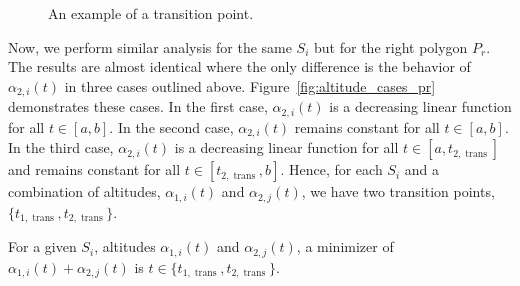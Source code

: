 \documentclass[../main.tex]{subfiles}
\begin{document}

\begin{figure}
	\centering
	
	\caption{An example of a transition point.}
	\label{fig:transition_point}
\end{figure}


Now, we perform similar analysis for the same $S_i$ but for the right polygon $P_r$. The results are almost identical where the only difference is the behavior of $\alpha_{2,i}(t)$ in three cases outlined above. Figure~\ref{fig:altitude_cases_pr} demonstrates these cases. In the first case, $\alpha_{2,i}(t)$ is a decreasing linear function for all $t\in[a,b]$. In the second case, $\alpha_{2,i}(t)$ remains constant for all $t\in[a,b]$. In the third case, $\alpha_{2,i}(t)$ is a decreasing linear function for all $t\in[a,t_{2,\operatorname{trans}}]$ and remains constant for all $t\in[t_{2,\operatorname{trans}},b]$. Hence, for each $S_i$ and a combination of altitudes, $\alpha_{1,i}(t)$ and $\alpha_{2,j}(t)$, we have two transition points, $\{t_{1,\operatorname{trans}}, t_{2,\operatorname{trans}}\}$.
\begin{lemma}
\label{lemma:min_at_trans_pts}
For a given $S_i$, altitudes $\alpha_{1,i}(t)$ and $\alpha_{2,j}(t)$, a minimizer of $\alpha_{1,i}(t)+\alpha_{2,j}(t)$ is $t\in\{t_{1,\operatorname{trans}}, t_{2,\operatorname{trans}}\}$.
\end{lemma}
\end{document}
